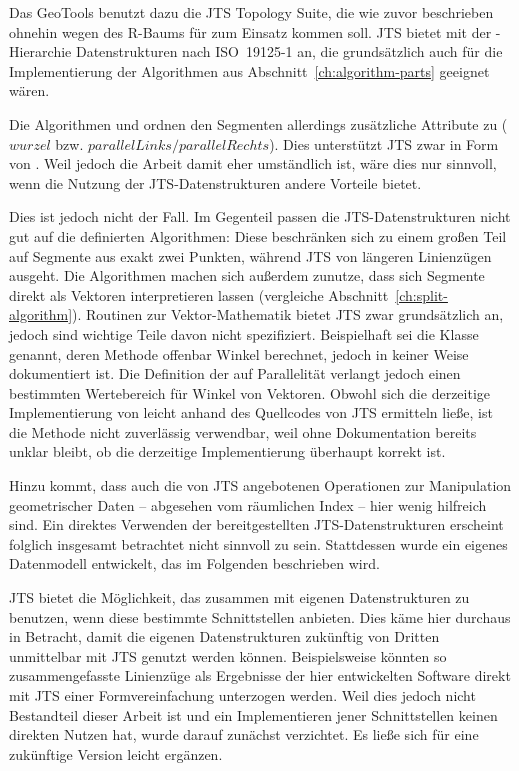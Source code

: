 \documentclass[../main/thesis.tex]{subfiles}
\begin{document}
\noindent
Das  GeoTools benutzt dazu die JTS Topology Suite, die wie zuvor beschrieben ohnehin wegen des R-Baums für  zum Einsatz kommen soll.
JTS bietet mit der -Hierarchie Datenstrukturen nach ISO~19125\hbox{-}1 an, die grundsätzlich auch für die Implementierung der Algorithmen aus Abschnitt~\ref{ch:algorithm-parts} geeignet wären.

Die Algorithmen  und  ordnen den Segmenten allerdings zusätzliche Attribute zu ($wurzel$ bzw. $parallelLinks / parallelRechts$).
Dies unterstützt JTS zwar in Form von .
Weil jedoch die Arbeit damit eher umständlich ist, wäre dies nur sinnvoll, wenn die Nutzung der JTS-Datenstrukturen andere Vorteile bietet.

Dies ist jedoch nicht der Fall.
Im Gegenteil passen die JTS-Datenstrukturen nicht gut auf die definierten Algorithmen:
Diese beschränken sich zu einem großen Teil auf Segmente aus exakt zwei Punkten, während JTS von längeren Linienzügen ausgeht.
Die Algorithmen machen sich außerdem zunutze, dass sich Segmente direkt als Vektoren interpretieren lassen (vergleiche Abschnitt~\ref{ch:split-algorithm}).
Routinen zur Vektor-Mathematik bietet JTS zwar grundsätzlich an, jedoch sind wichtige Teile davon nicht spezifiziert.
Beispielhaft sei die Klasse  genannt, deren Methode  offenbar Winkel berechnet, jedoch in keiner Weise dokumentiert ist.
Die Definition der  auf Parallelität verlangt jedoch einen bestimmten Wertebereich für Winkel von Vektoren.
Obwohl sich die derzeitige Implementierung von  leicht anhand des Quellcodes von JTS ermitteln ließe, ist die Methode nicht zuverlässig verwendbar, weil ohne Dokumentation bereits unklar bleibt, ob die derzeitige Implementierung überhaupt korrekt ist.

Hinzu kommt, dass auch die von JTS angebotenen Operationen zur Manipulation geometrischer Daten -- abgesehen vom räumlichen Index -- hier wenig hilfreich sind.
Ein direktes Verwenden der bereitgestellten JTS-Datenstrukturen erscheint folglich insgesamt betrachtet nicht sinnvoll zu sein.
Stattdessen wurde ein eigenes Datenmodell entwickelt, das im Folgenden beschrieben wird.

JTS bietet die Möglichkeit, das  zusammen mit eigenen Datenstrukturen zu benutzen, wenn diese bestimmte Schnittstellen anbieten.
Dies käme hier durchaus in Betracht, damit die eigenen Datenstrukturen zukünftig von Dritten unmittelbar mit JTS genutzt werden können.
Beispielsweise könnten so zusammengefasste Linienzüge als Ergebnisse der hier entwickelten Software direkt mit JTS einer Formvereinfachung unterzogen werden.
Weil dies jedoch nicht Bestandteil dieser Arbeit ist und ein Implementieren jener Schnittstellen keinen direkten Nutzen hat, wurde darauf zunächst verzichtet.
Es ließe sich für eine zukünftige Version leicht ergänzen.
\end{document}
